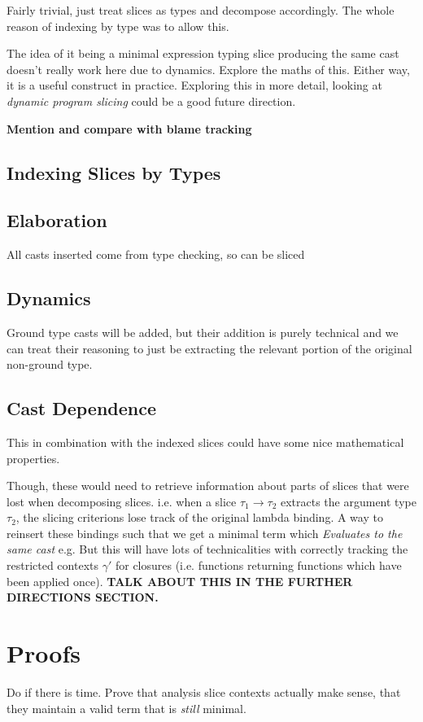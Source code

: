 Fairly trivial, just treat slices as types and decompose accordingly. The whole reason of indexing by type was to allow this.

The idea of it being a minimal expression typing slice producing the same cast doesn't really work here due to dynamics. Explore the maths of this. Either way, it is a useful construct in practice. Exploring this in more detail, looking at \textit{dynamic program slicing} could be a good future direction.

\textbf{Mention and compare with blame tracking}

\subsection{Indexing Slices by Types}


\subsection{Elaboration}
All casts inserted come from type checking, so can be sliced

\subsection{Dynamics}
Ground type casts will be added, but their addition is purely technical and we can treat their reasoning to just be extracting the relevant portion of the original non-ground type.

\subsection{Cast Dependence}
This in combination with the indexed slices could have some nice mathematical properties.

Though, these would need to retrieve information about parts of slices that were lost when decomposing slices. i.e. when a slice $\tau_1 \to \tau_2$ extracts the argument type $\tau_2$, the slicing criterions lose track of the original lambda binding. A way to reinsert these bindings such that we get a minimal term which \textit{Evaluates to the same cast} e.g. But this will have lots of technicalities with correctly tracking the restricted contexts $\gamma'$ for closures (i.e. functions returning functions which have been applied once). \textbf{TALK ABOUT THIS IN THE FURTHER DIRECTIONS SECTION.}

\section{Proofs}\label{sec:Proofs}
Do if there is time. Prove that analysis slice contexts actually make sense, that they maintain a valid term that is \textit{still} minimal.

